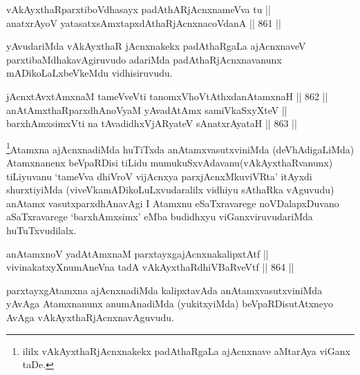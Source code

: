 \begin{shl}
vAkAyxthaRparxtiboVdhasayx padAthARjAcnxnameVva tu || \\
anatxrAyoV yatasatxsAmxtapxdAthaRjAcnxnacoVdanA \hfill || 861 ||  
\end{shl}

\begin{artha}
yAvudariMda vAkAyxthaR jAcnxnakekx padAthaRgaLa ajAcnxnaveV parxtibaMdhakavAgiruvudo adariMda padAthaRjAcnxnavanunx mADikoLaLxbeVkeMdu vidhisiruvudu.
\end{artha}


\begin{shl}
jAcnxtAvx\s \s tAmxnaM tameVveVti tanomxVhoVtAthxdanAtamxnaH \hfill || 862 ||  \\
anAtAmxthaRparxdhAnoV\s yaM yAvadAtAmx samiVkaSxyXteV || \\
barxhAmxsimxVti na tAvadidhxVjARyateV sAnatxrAyataH \hfill || 863 ||  
\end{shl}

\begin{artha}
\footnote{ililx vAkAyxthaRjAcnxnakekx padAthaRgaLa ajAcnxnave aMtarAya viGanx taDe.}Atamxna ajAcnxnadiMda huTiTxda anAtamxvasutxviniMda (deVhAdigaLiMda) Atamxnanenx beVpaRDisi tiLidu mumukuSxvAdavanu(vAkAyxthaRvanunx) tiLiyuvanu `tameVva dhiVroV vijAcnxya parxjAcnxMkuviVRta' itAyxdi shurxtiyiMda (viveVkamADikoLuLxvudaralilx vidhiyu sAthaRka vAguvudu) anAtamx vasutxparxdhAnavAgi I Atamxnu eSaTxravarege noVDalapxDuvano aSaTxravarege `barxhAmxsimx' eMba budidhxyu viGanxviruvudariMda huTuTxvudilalx.
\end{artha}


\begin{shl}
anAtamxnoV yadA\s \s tAmxnaM parxtayxgajAcnxnakalipxtAtf || \\
vivinakatxyXnumAneVna tadA vAkAyxthaRdhiVBaRveVtf \hfill || 864 ||  
\end{shl}

\begin{artha}
parxtayxgAtamxna ajAcnxnadiMda kalipxtavAda anAtamxvasutxviniMda yAvAga Atamxnanunx anumAnadiMda (yukitxyiMda) beVpaRDisutAtxneyo AvAga vAkAyxthaRjAcnxnavAguvudu.
\end{artha}


